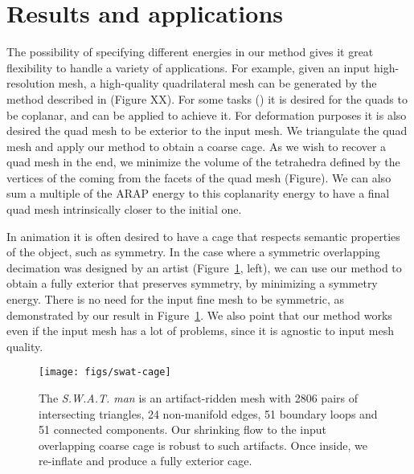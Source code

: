\section{Results and applications}
\label{sec:results}



The possibility of specifying different energies in our method
gives it great flexibility to handle a variety of applications. For example,
given an input high-resolution mesh,
a high-quality quadrilateral mesh can be generated by
the method described in \cite{Takayama:2013} (Figure XX). For some tasks
() it is desired for the quads to be coplanar,
and  can be applied to achieve it.
For deformation purposes it is also desired the quad mesh to be exterior to the input mesh. 
We triangulate the quad mesh and apply our method to obtain a
coarse cage. As we wish to recover a quad mesh in the end, we minimize
the volume of the tetrahedra defined by the vertices of the coming from 
the facets of the quad mesh (Figure).
We can also sum a multiple of the ARAP energy to this coplanarity energy
to have a final quad mesh intrinsically closer to the initial one.

In animation it is often desired to have a cage that respects semantic
properties of the object, such as symmetry. In the case where a symmetric overlapping
decimation was designed by an artist (Figure~\ref{fig:swat-cage}, left), we can use our method 
to obtain a fully exterior that preserves symmetry, by minimizing a symmetry energy. 
There is no need for the input fine mesh to be symmetric, as demonstrated
by our result in Figure~\ref{fig:swat-cage}. We also point that our method works
even if the input mesh has a lot of problems, since it is agnostic to input mesh quality.

\begin{figure}
  \texttt{[image: figs/swat-cage]}
  \caption{The \emph{S.W.A.T. man} is an artifact-ridden mesh with 2806 pairs
  of intersecting triangles, 24 non-manifold edges, 51 boundary loops and 51
  connected components. Our shrinking flow to the input overlapping coarse cage
  is robust to such artifacts. Once inside, we re-inflate and produce a fully
  exterior cage.}
  \label{fig:swat-cage}
\end{figure}

